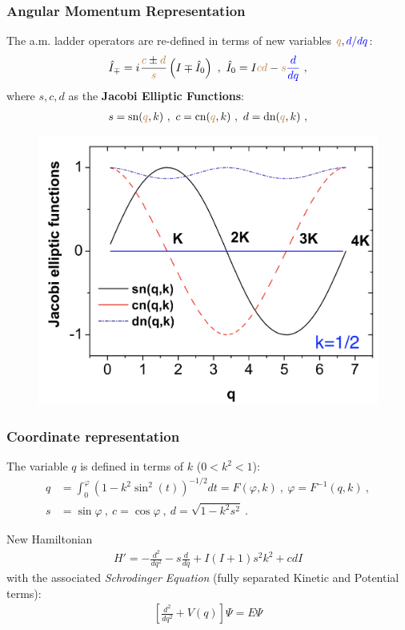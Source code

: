 \documentclass{beamer}
\newcommand{\iu}{{i\mkern1mu}}
\begin{document}
\begin{frame}
  \frametitle{Angular Momentum Representation}
  The a.m. ladder operators are re-defined in terms of new variables ${\color{brown}q},{\color{blue}d/dq}$:
  \begin{align}
    \hat{I}_\mp=\iu\frac{{\color{brown}c}\pm {\color{brown}d}}{\color{brown}s}\left(I\mp\hat{I}_0\right)\ ,\ \hat{I}_0=I{\color{brown}cd}-{\color{brown}s}{\color{blue}\frac{d}{dq}}\ ,
  \end{align}
  where $s,c,d$ as the \textbf{Jacobi Elliptic Functions}:
    \begin{align}
      s=\text{sn}({\color{brown}q},k)\ ,\ c=\text{cn}({\color{brown}q},k)\ ,\ d=\text{dn}({\color{brown}q},k)\ ,
    \end{align}
  \begin{figure}
    \includegraphics[scale=0.17]{figures/jacobi-functions.png}
  \end{figure}
\end{frame}

\begin{frame}
  \frametitle{Coordinate representation}
  The variable $q$ is defined in terms of $k$ ($0<k^2<1$):
\begin{align}
  q&=\int_0^\varphi\left(1-k^2\sin^2(t)\right)^{-1/2}dt=F(\varphi,k)\ ,\ \varphi=F^{-1}(q,k)\ ,\\
  s&=\sin\varphi\ ,\ c=\cos\varphi\ ,\ d=\sqrt{1-k^2s^2}\ .
\end{align}
\begin{exampleblock}{New Hamiltonian}
  \begin{align}
      H'=-\frac{d^2}{dq^2}-s\frac{d}{dq}+I(I+1)s^2k^2+cdI
  \end{align}
  with the associated \emph{Schrodinger Equation} (fully separated Kinetic and Potential terms):
  \begin{align}
    \left[\frac{d^2}{dq^2}+V(q)\right]\Psi=E\Psi
  \end{align}
\end{exampleblock}
\end{frame}
\end{document}
